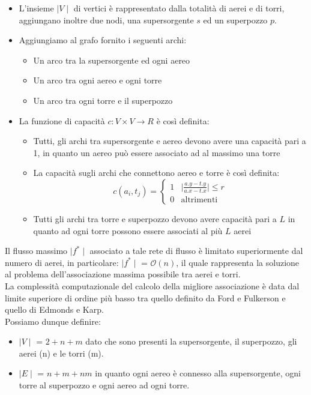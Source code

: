\documentclass[../cheatSheetAlgoritmi.tex]{subfiles}
\begin{document}
\begin{itemize}
    \item L'insieme $\mid V \mid$ di vertici è rappresentato dalla totalità di aerei e di torri, aggiungano inoltre due nodi, una supersorgente $s$ ed un superpozzo $p$.
    \item Aggiungiamo al grafo fornito i seguenti archi:
    \begin{itemize}
        \item Un arco tra la supersorgente ed ogni aereo
        \item Un arco tra ogni aereo e ogni torre
        \item Un arco tra ogni torre e il superpozzo
    \end{itemize}
    \item La funzione di capacità $c: V \times V \rightarrow R$ è così definita:
    \begin{itemize}
        \item Tutti, gli archi tra supersorgente e aereo devono avere una capacità pari a 1, in quanto un aereo può essere associato ad al massimo una torre
        \item La capacità sugli archi che connettono aereo e torre è così definita:
            \begin{equation*}
                c(a_{i}, t_{j})=\begin{cases}
                    1 & \text{$\mid \frac{a.y - t.y}{a.x - t.x} \mid \leq r$} \\
                    0 & \text{altrimenti}
                \end{cases}
            \end{equation*}
        \item Tutti gli archi tra torre e superpozzo devono avere capacità pari a $L$ in quanto ad ogni torre possono essere associati al più $L$ aerei
    \end{itemize}
\end{itemize}
Il flusso massimo $\mid f^* \mid$ associato a tale rete di flusso è limitato superiormente dal numero di aerei, in particolare: $\mid f^* \mid$ = $\mathcal{O}(n)$, il quale rappresenta la soluzione al problema dell'associazione massima possibile tra aerei e torri. \\
La complessità computazionale del calcolo della migliore associazione è data dal limite superiore di ordine più basso tra quello definito da Ford e Fulkerson e quello di Edmonds e Karp. \\
Possiamo dunque definire: 
\begin{itemize}
    \item $\mid V \mid$ = $2 + n + m$ dato che sono presenti la supersorgente, il superpozzo, gli aerei (n) e le torri (m).
    \item $\mid E \mid$ = $n + m + nm$ in quanto ogni aereo è connesso alla supersorgente, ogni torre al superpozzo e ogni aereo ad ogni torre.
\end{itemize}
\end{document}
